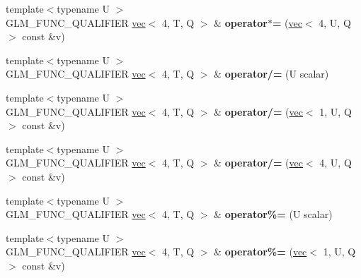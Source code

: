 \begin{DoxyCompactItemize}
{\footnotesize template$<$typename U $>$ }\\G\+L\+M\+\_\+\+F\+U\+N\+C\+\_\+\+Q\+U\+A\+L\+I\+F\+I\+ER \hyperlink{structglm_1_1vec}{vec}$<$ 4, T, Q $>$ \& {\bfseries operator$\ast$=} (\hyperlink{structglm_1_1vec}{vec}$<$ 4, U, Q $>$ const \&v)
\item 
\mbox{\label{structglm_1_1vec_3_014_00_01T_00_01Q_01_4_ab603e1376b20ee1ba7060973d0028adb}} 
{\footnotesize template$<$typename U $>$ }\\G\+L\+M\+\_\+\+F\+U\+N\+C\+\_\+\+Q\+U\+A\+L\+I\+F\+I\+ER \hyperlink{structglm_1_1vec}{vec}$<$ 4, T, Q $>$ \& {\bfseries operator/=} (U scalar)
\item 
\mbox{\label{structglm_1_1vec_3_014_00_01T_00_01Q_01_4_a7ee45c65277f9dfee48514e35d163a6a}} 
{\footnotesize template$<$typename U $>$ }\\G\+L\+M\+\_\+\+F\+U\+N\+C\+\_\+\+Q\+U\+A\+L\+I\+F\+I\+ER \hyperlink{structglm_1_1vec}{vec}$<$ 4, T, Q $>$ \& {\bfseries operator/=} (\hyperlink{structglm_1_1vec}{vec}$<$ 1, U, Q $>$ const \&v)
\item 
\mbox{\label{structglm_1_1vec_3_014_00_01T_00_01Q_01_4_aa9830c51f8b9bfc55e3d670007358be0}} 
{\footnotesize template$<$typename U $>$ }\\G\+L\+M\+\_\+\+F\+U\+N\+C\+\_\+\+Q\+U\+A\+L\+I\+F\+I\+ER \hyperlink{structglm_1_1vec}{vec}$<$ 4, T, Q $>$ \& {\bfseries operator/=} (\hyperlink{structglm_1_1vec}{vec}$<$ 4, U, Q $>$ const \&v)
\item 
\mbox{\label{structglm_1_1vec_3_014_00_01T_00_01Q_01_4_ab18a2c7d078b35f9b8043ec429805577}} 
{\footnotesize template$<$typename U $>$ }\\G\+L\+M\+\_\+\+F\+U\+N\+C\+\_\+\+Q\+U\+A\+L\+I\+F\+I\+ER \hyperlink{structglm_1_1vec}{vec}$<$ 4, T, Q $>$ \& {\bfseries operator\%=} (U scalar)
\item 
\mbox{\label{structglm_1_1vec_3_014_00_01T_00_01Q_01_4_a14fc67ccd918340ef8c1c1f584e8a4bb}} 
{\footnotesize template$<$typename U $>$ }\\G\+L\+M\+\_\+\+F\+U\+N\+C\+\_\+\+Q\+U\+A\+L\+I\+F\+I\+ER \hyperlink{structglm_1_1vec}{vec}$<$ 4, T, Q $>$ \& {\bfseries operator\%=} (\hyperlink{structglm_1_1vec}{vec}$<$ 1, U, Q $>$ const \&v)

\end{DoxyCompactItemize}
